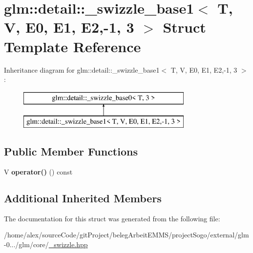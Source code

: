 \hypertarget{structglm_1_1detail_1_1__swizzle__base1_3_01T_00_01V_00_01E0_00_01E1_00_01E2_00-1_00_013_01_4}{\section{glm\-:\-:detail\-:\-:\-\_\-swizzle\-\_\-base1$<$ T, V, E0, E1, E2,-\/1, 3 $>$ Struct Template Reference}
\label{structglm_1_1detail_1_1__swizzle__base1_3_01T_00_01V_00_01E0_00_01E1_00_01E2_00-1_00_013_01_4}
}
Inheritance diagram for glm\-:\-:detail\-:\-:\-\_\-swizzle\-\_\-base1$<$ T, V, E0, E1, E2,-\/1, 3 $>$\-:\begin{figure}[H]
\begin{center}
\leavevmode
\includegraphics[height=2.000000cm]{structglm_1_1detail_1_1__swizzle__base1_3_01T_00_01V_00_01E0_00_01E1_00_01E2_00-1_00_013_01_4}
\end{center}
\end{figure}
\subsection*{Public Member Functions}
\begin{DoxyCompactItemize}
\item 
\hypertarget{structglm_1_1detail_1_1__swizzle__base1_3_01T_00_01V_00_01E0_00_01E1_00_01E2_00-1_00_013_01_4_a76abd8070d51fabf296fa625bfaa2302}{V {\bfseries operator()} () const }\label{structglm_1_1detail_1_1__swizzle__base1_3_01T_00_01V_00_01E0_00_01E1_00_01E2_00-1_00_013_01_4_a76abd8070d51fabf296fa625bfaa2302}

\end{DoxyCompactItemize}
\subsection*{Additional Inherited Members}


The documentation for this struct was generated from the following file\-:\begin{DoxyCompactItemize}
\item 
/home/alex/source\-Code/git\-Project/beleg\-Arbeit\-E\-M\-M\-S/project\-Sogo/external/glm-\/0.../glm/core/\hyperlink{__swizzle_8hpp}{\-\_\-swizzle.\-hpp}\end{DoxyCompactItemize}
